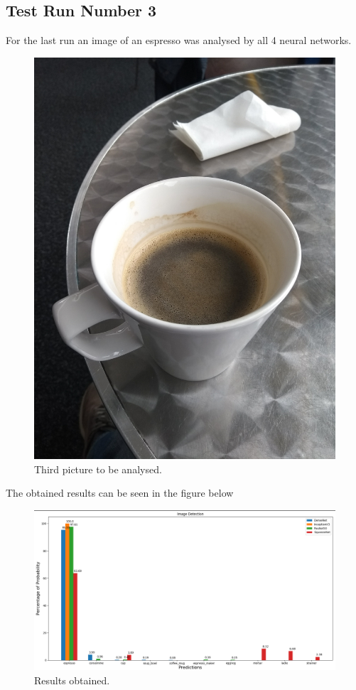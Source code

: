     \subsection{Test Run Number 3}
    \par For the last run an image of an espresso was analysed by all 4 neural networks.
    \begin{figure}[htb]
        \centering
        \includegraphics[scale = 0.04]{Sections/4InitialWork/4_images/run4_pic.jpg}
        \caption{Third picture to be analysed.} 
    \end{figure}
    \par The obtained results can be seen in the figure below
    \begin{figure}[htb]
        \centering
        \includegraphics[scale = 0.37]{Sections/4InitialWork/4_images/run4_res.png}
        \caption{Results obtained.} 
    \end{figure}
    
